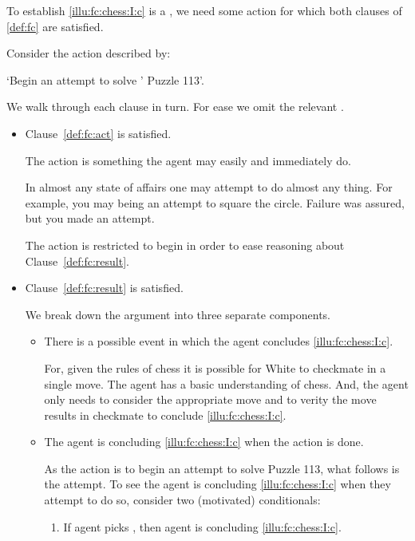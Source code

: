 \begin{note}
  To establish \ref{illu:fc:chess:I:c} is a \fc{}, we need some action for which both clauses of \autoref{def:fc} are satisfied.

  Consider the action described by:

  \begin{center}
    `Begin an attempt to solve \citeauthor{Emms:2000aa}' Puzzle 113'.
  \end{center}

  \noindent We walk through each clause in turn.
  For ease we omit the relevant \pool{}.

  \begin{itemize}[leftmargin=*]
  \item
    Clause~\ref{def:fc:act} is satisfied.

    The action is something the agent may easily and immediately do.

    In almost any state of affairs one may attempt to do almost any thing.
    For example, you may being an attempt to square the circle.
    Failure was assured, but you made an attempt.

    The action is restricted to begin in order to ease reasoning about Clause~\ref{def:fc:result}.
  \item
    Clause~\ref{def:fc:result} is satisfied.

    We break down the argument into three separate components.

    \begin{itemize}
    \item
      There is a possible event in which the agent concludes \ref{illu:fc:chess:I:c}.

      For, given the rules of chess it is possible for White to checkmate in a single move.
      The agent has a basic understanding of chess.
      And, the agent only needs to consider the appropriate move and to verity the move results in checkmate to conclude \ref{illu:fc:chess:I:c}.

    \item
      The agent is concluding \ref{illu:fc:chess:I:c} when the action is done.

      As the action is to begin an attempt to solve Puzzle 113, what follows is the attempt.
      To see the agent is concluding \ref{illu:fc:chess:I:c} when they attempt to do so, consider two (motivated) conditionals:

      \begin{enumerate}[label=\arabic*., ref=(\arabic*)]
      \item
        \label{illu:fc:chess:I:cond:1}
        If agent picks , then agent is concluding \ref{illu:fc:chess:I:c}.%
        \smallskip


\end{enumerate}
\end{itemize}
\end{itemize}
\end{note}
